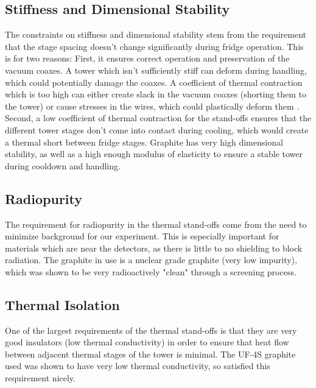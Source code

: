 \documentclass{report}
\begin{document}
\subsection{Stiffness and Dimensional Stability}
The constraints on stiffness and dimensional stability stem from the requirement that the stage spacing doesn't change significantly during fridge operation. This is for two reasons: First, it ensures correct operation and preservation of the vacuum coaxes. A tower which isn't sufficiently stiff can deform during handling, which could potentially damage the coaxes. A coefficient of thermal contraction which is too high can either create slack in the vacuum coaxes (shorting them to the tower) or cause stresses in the wires, which could plastically deform them \footnotemark.  Second, a low coefficient of thermal contraction for the stand-offs ensures that the different tower stages don't come into contact during cooling, which would create a thermal short between fridge stages\footnotemark. Graphite has very high dimensional stability, as well as a high enough modulus of elasticity to ensure a stable tower during cooldown and handling.


\subsection{Radiopurity}
The requirement for radiopurity in the thermal stand-offs come from the need to minimize background for our experiment. This is especially important for materials which are near the detectors, as there is little to no shielding to block radiation. The graphite in use is a nuclear grade graphite (very low impurity), which was shown to be very radioactively "clean" through a screening process.

\subsection{Thermal Isolation}
One of the largest requirements of the thermal stand-offs is that they are very good insulators (low thermal conductivity) in order to ensure that heat flow between adjacent thermal stages of the tower is minimal. The UF-4S graphite used was shown to have very low thermal conductivity, so satisfied this requirement nicely.
\end{document}

